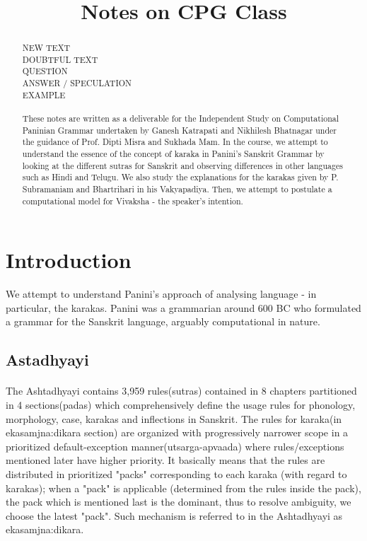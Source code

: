\documentclass[a4paper,10pt]{article}
\title{Notes on CPG Class}
\author{}
\begin{document}
\maketitle

\newpage
\tableofcontents

\newpage
\begin{abstract}
\color{black!100}
NEW TEXT\\
\color{blue!100}
DOUBTFUL TEXT\\
\color{red!100}
QUESTION\\
\color{green!100}
ANSWER / SPECULATION\\
\color{purple!100}
EXAMPLE\\
\color{black!100}
\paragraph{}These notes are written as a deliverable for the Independent Study on Computational Paninian Grammar undertaken by Ganesh Katrapati and Nikhilesh Bhatnagar under the guidance of Prof. Dipti Misra and Sukhada Mam. In the course, we attempt to understand the essence of the concept of karaka in Panini's Sanskrit Grammar by looking at the different sutras for Sanskrit and observing differences in other languages such as Hindi and Telugu. We also study the explanations for the karakas given by P. Subramaniam and Bhartrihari in his Vakyapadiya. Then, we attempt to postulate a computational model for Vivaksha - the speaker's intention.
\end{abstract}

\newpage
\section{Introduction}
\color{black!100}We attempt to understand Panini's approach of analysing language - in particular, the karakas. Panini was a grammarian around 600 BC who formulated a grammar for the Sanskrit language, arguably computational in nature.

\subsection{Astadhyayi}
\paragraph{}
\color{black!100}The Ashtadhyayi contains 3,959 rules(sutras) contained in 8 chapters partitioned in 4 sections(padas) which comprehensively define the usage rules for phonology, morphology, case, karakas and inflections in Sanskrit. The rules for karaka(in ekasamjna:dikara section) are organized with progressively narrower scope in a prioritized default-exception manner(utsarga-apvaada) where rules/exceptions mentioned later have higher priority. It basically means that the rules are distributed in prioritized "packs" corresponding to each karaka (with regard to karakas); when a "pack" is applicable (determined from the rules inside the pack), the pack which is mentioned last is the dominant, thus to resolve ambiguity, we choose the latest "pack". Such mechanism is referred to in the Ashtadhyayi as ekasamjna:dikara.
\end{document}
